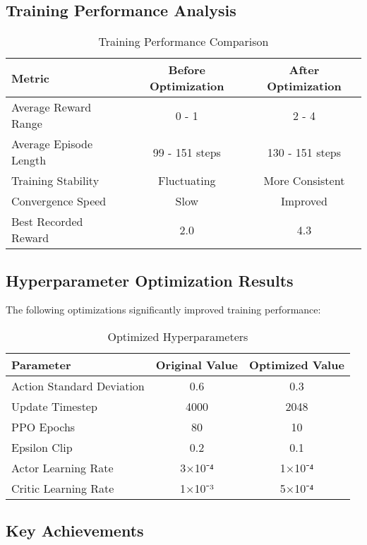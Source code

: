 \documentclass[12pt,a4paper]{article}
\begin{document}
\subsection{Training Performance Analysis}

\begin{table}[H]
\centering
\caption{Training Performance Comparison}
\begin{tabular}{@{}lcc@{}}
\toprule
Metric & Before Optimization & After Optimization \\
\midrule
Average Reward Range & 0 - 1 & 2 - 4 \\
Average Episode Length & 99 - 151 steps & 130 - 151 steps \\
Training Stability & Fluctuating & More Consistent \\
Convergence Speed & Slow & Improved \\
Best Recorded Reward & 2.0 & 4.3 \\
\bottomrule
\end{tabular}
\end{table}

\subsection{Hyperparameter Optimization Results}

The following optimizations significantly improved training performance:

\begin{table}[H]
\centering
\caption{Optimized Hyperparameters}
\begin{tabular}{@{}lcc@{}}
\toprule
Parameter & Original Value & Optimized Value \\
\midrule
Action Standard Deviation & 0.6 & 0.3 \\
Update Timestep & 4000 & 2048 \\
PPO Epochs & 80 & 10 \\
Epsilon Clip & 0.2 & 0.1 \\
Actor Learning Rate & 3×10⁻⁴ & 1×10⁻⁴ \\
Critic Learning Rate & 1×10⁻³ & 5×10⁻⁴ \\
\bottomrule
\end{tabular}
\end{table}

\subsection{Key Achievements}
\end{document}
